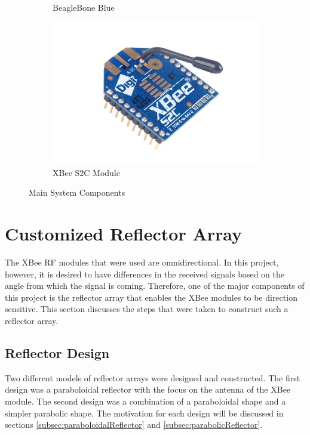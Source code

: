 \begin{figure}[H]
\begin{subfigure}[t]{0.32\textwidth}
    \captionsetup{width=\textwidth}
    \caption{BeagleBone Blue}
    \label{fig:beagleboneBlue}
  \end{subfigure}
  \begin{subfigure}[t]{0.32\textwidth}
    \includegraphics[width=1\textwidth]{figs/img/Xbee-S2C-Module}
    \captionsetup{width=\textwidth}
    \caption{XBee S2C Module}
    \label{fig:XBeeModule}
  \end{subfigure}
  \caption{Main System Components}
\end{figure}

\section{Customized Reflector Array}\label{sec:customReflector}
The XBee RF modules that were used are omnidirectional. In this project, however, it is desired to have differences in the received signals based on the angle from which the signal is coming. Therefore, one of the major components of this project is the reflector array that enables the XBee modules to be direction sensitive. This section discusses the steps that were taken to construct such a reflector array.

\subsection{Reflector Design}
Two different models of reflector arrays were designed and constructed. The first design was a paraboloidal reflector with the focus on the antenna of the XBee module. The second design was a combination of a paraboloidal shape and a simpler parabolic shape. The motivation for each design will be discussed in sections \ref{subsec:paraboloidalReflector} and \ref{subsec:parabolicReflector}.

